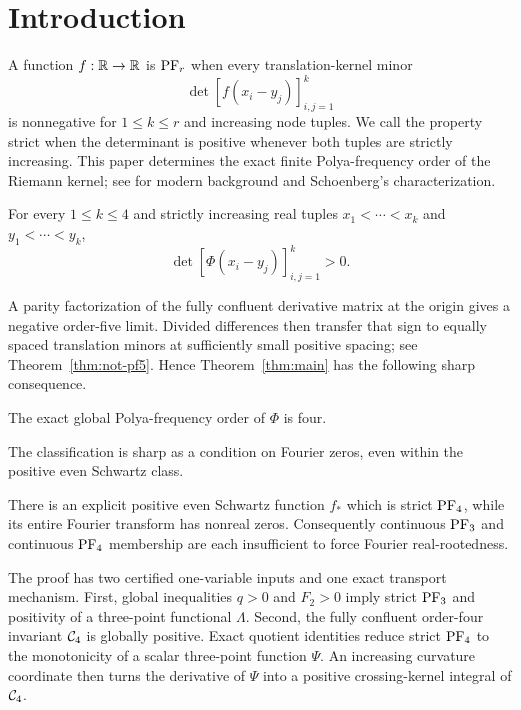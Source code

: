 \section{Introduction}\label{sec:introduction}

A function \(f:\mathbb{R}\to\mathbb{R}\) is \(\mathrm{PF}_r\) when every translation-kernel minor
\[
 \det[f(x_i-y_j)]_{i,j=1}^k
\]
is nonnegative for \(1\leq k\leq r\) and increasing node tuples. We call the
property strict when the determinant is positive whenever both tuples are
strictly increasing. This paper determines the exact finite Polya-frequency
order of the Riemann kernel; see \cite{belton} for modern background and
Schoenberg's characterization.

\begin{theorem}\label{thm:main}
For every \(1\leq k\leq4\) and strictly increasing real tuples
\(x_1<\cdots<x_k\) and \(y_1<\cdots<y_k\),
\[
 \det[\Phi(x_i-y_j)]_{i,j=1}^k>0.
\]
\end{theorem}

A parity factorization of the fully confluent derivative matrix at the origin
gives a negative order-five limit. Divided differences then transfer that sign
to equally spaced translation minors at sufficiently small positive spacing;
see Theorem~\ref{thm:not-pf5}. Hence Theorem~\ref{thm:main} has the following
sharp consequence.

\begin{corollary}\label{cor:exact-order}
The exact global Polya-frequency order of \(\Phi\) is four.
\end{corollary}

The classification is sharp as a condition on Fourier zeros, even within the
positive even Schwartz class.

\begin{theorem}\label{thm:separator}
There is an explicit positive even Schwartz function \(f_*\) which is strict
\(\mathrm{PF}_4\), while its entire Fourier transform has nonreal zeros.
Consequently continuous \(\mathrm{PF}_3\) and continuous \(\mathrm{PF}_4\) membership are
each insufficient to force Fourier real-rootedness.
\end{theorem}

The proof has two certified one-variable inputs and one exact transport
mechanism. First, global inequalities \(q>0\) and \(F_2>0\) imply strict
\(\mathrm{PF}_3\) and positivity of a three-point functional \(\Lambda\). Second, the
fully confluent order-four invariant \(\mathcal{C}_4\) is globally positive. Exact
quotient identities reduce strict \(\mathrm{PF}_4\) to the monotonicity of a scalar
three-point function \(\Psi\). An increasing curvature coordinate then turns
the derivative of \(\Psi\) into a positive crossing-kernel integral of
\(\mathcal{C}_4\).

